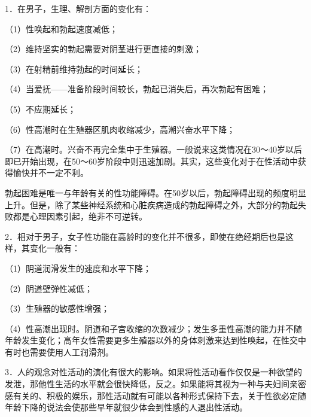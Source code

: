 \documentclass[12pt,UTF8]{ctexbook}
\begin{document}
1．在男子，生理、解剖方面的变化有：

（1）性唤起和勃起速度减低；

（2）维持坚实的勃起需要对阴茎进行更直接的刺激；

（3）在射精前维持勃起的时间延长；

（4）当爱抚——准备阶段时间较长，勃起已消失后，再次勃起有困难；

（5）不应期延长；

（6）性高潮时在生殖器区肌肉收缩减少，高潮兴奋水平下降；

（7）在高潮时。兴奋不再完全集中于生殖器。一般说来这类情况在30～40岁以后即已开始出现，在50～60岁阶段中则迅速加剧。其实，这些变化对于在性活动中获得愉快并不一定不利。

勃起困难是唯一与年龄有关的性功能障碍。在50岁以后，勃起障碍出现的频度明显上升。但是，除了某些神经系统和心脏疾病造成的勃起障碍之外，大部分的勃起失败都是心理因素引起，绝非不可逆转。

2．相对于男子，女子性功能在高龄时的变化并不很多，即使在绝经期后也是这样，其变化一般有：

（1）阴道润滑发生的速度和水平下降；

（2）阴道壁弹性减低；

（3）生殖器的敏感性增强；

（4）性高潮出现时。阴道和子宫收缩的次数减少；发生多重性高潮的能力并不随年龄发生变化；高年女性需要更多生殖器以外的身体刺激来达到性唤起，在性交中有时也需要使用人工润滑剂。

3．人的观念对性活动的演化有很大的影响。如果将性活动看作仅仅是一种欲望的发泄，那他性生活的水平就会很快降低，反之。如果能将其视为一种与夫妇间亲密感有关的、积极的娱乐，那性活动就有可能以各种形式保持下去，关于性欲必定随年龄下降的说法会使那些早年就很少体会到性感的人退出性活动。
\end{document}
